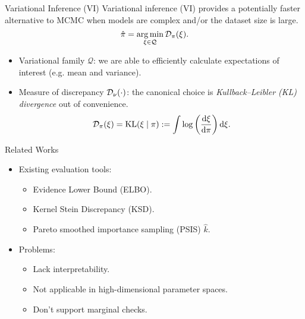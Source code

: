 \documentclass[10pt,xcolor=table]{beamer}
\begin{document}
\begin{frame}{Variational Inference (VI)}
Variational inference (VI) provides a potentially faster alternative to MCMC when models are complex and/or the dataset size is large.
\[
\hat{\posteriorDensity}   = \argmin_{\xi \in \mathcal{Q}} \mathcal{D}_{\posteriorDensity}(\xi).
\]
\begin{itemize}
    \item Variational family $\mathcal{Q}$: we are able to efficiently calculate
expectations of interest (e.g. mean and variance).  
    \item Measure of discrepancy $\mathcal{D}_{\nu}(\cdot)$: the canonical choice is \emph{Kullback--Leibler (KL) divergence} out of convenience. 
\[
\mathcal{D}_{\pi}(\xi) = \mathrm{KL}(\xi \mid \pi) :=\int \log \left(\frac{\mathrm{d} \xi}{\mathrm{d} \pi}\right) \mathrm{d} \xi.
\]
\end{itemize}
\end{frame}

\begin{frame}{Related Works}
\begin{itemize}
    \item Existing evaluation tools:
    \begin{itemize}
        \item Evidence Lower Bound (ELBO).
        \item Kernel Stein Discrepancy (KSD).
        \item Pareto smoothed importance sampling (PSIS) $\hat{k}$.
    \end{itemize}
    \item Problems:
    \begin{itemize}
        \item Lack interpretability.
        \item Not applicable in high-dimensional parameter spaces.
        \item Don't support marginal checks.
    \end{itemize}
\end{itemize}
\end{frame}
\end{document}
